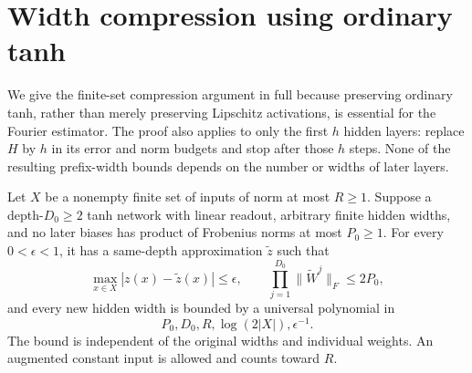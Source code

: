 \section{Width compression using ordinary tanh}
\label{sec:pf-width-compression}

We give the finite-set compression argument in full because preserving
ordinary tanh, rather than merely preserving Lipschitz activations, is
essential for the Fourier estimator. The proof also applies to only the
first $h$ hidden layers: replace $H$ by $h$ in its error and norm budgets
and stop after those $h$ steps. None of the resulting prefix-width bounds
depends on the number or widths of later layers.

\begin{theorem}
\label{thm:pf-width-compression}
Let $X$ be a nonempty finite set of inputs of norm at most $R\ge1$.
Suppose a depth-$D_0\ge2$ tanh network with linear readout, arbitrary
finite hidden widths, and no later biases has product of Frobenius norms
at most $P_0\ge1$. For every $0<\epsilon<1$, it has a same-depth
approximation $\widetilde z$ such that
\[
 \max_{x\in X}|z(x)-\widetilde z(x)|\le\epsilon,
 \qquad \prod_{j=1}^{D_0}\|\widetilde W^j\|_F\le2P_0,
\]
and every new hidden width is bounded by a universal polynomial in
\[
 P_0,D_0,R,\log(2|X|),\epsilon^{-1}.
\]
The bound is independent of the original widths and individual weights.
An augmented constant input is allowed and counts toward $R$.
\end{theorem}

